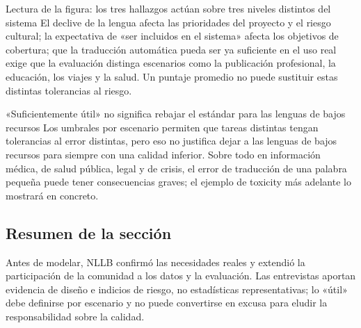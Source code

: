 
\begin{knowledgebox}{Lectura de la figura: los tres hallazgos actúan sobre tres niveles distintos del sistema}
El declive de la lengua afecta las prioridades del proyecto y el riesgo cultural; la expectativa de «ser incluidos en el sistema» afecta los objetivos de cobertura; que la traducción automática pueda ser ya suficiente en el uso real exige que la evaluación distinga escenarios como la publicación profesional, la educación, los viajes y la salud. Un puntaje promedio no puede sustituir estas distintas tolerancias al riesgo.
\end{knowledgebox}

\begin{warningbox}{«Suficientemente útil» no significa rebajar el estándar para las lenguas de bajos recursos}
Los umbrales por escenario permiten que tareas distintas tengan tolerancias al error distintas, pero eso no justifica dejar a las lenguas de bajos recursos para siempre con una calidad inferior. Sobre todo en información médica, de salud pública, legal y de crisis, el error de traducción de una palabra pequeña puede tener consecuencias graves; el ejemplo de toxicity más adelante lo mostrará en concreto.
\end{warningbox}


\subsection{Resumen de la sección}

Antes de modelar, NLLB confirmó las necesidades reales y extendió la participación de la comunidad a los datos y la evaluación. Las entrevistas aportan evidencia de diseño e indicios de riesgo, no estadísticas representativas; lo «útil» debe definirse por escenario y no puede convertirse en excusa para eludir la responsabilidad sobre la calidad.
